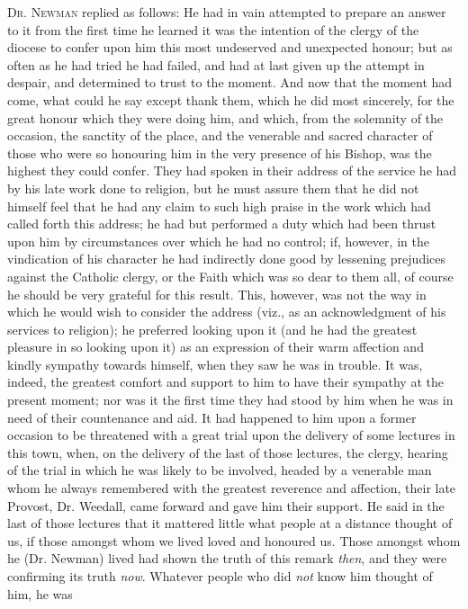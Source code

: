 D\textsc{r}. N\textsc{ewman}
replied as follows: He had in vain attempted to prepare an answer to
it from the first time he learned it was the intention of the clergy
of the diocese to confer upon him this most undeserved and unexpected
honour; but as often as he had tried he had failed, and had at last
given up the attempt in despair, and determined to trust to the
moment. And now that the moment had come, what could he say except
thank them, which he did most sincerely, for the great honour which
they were doing him, and which, from the solemnity of the occasion,
the sanctity of the place, and the venerable and sacred character of
those who were so honouring him in the very presence of his Bishop,
was the highest they could confer. They had spoken in their address of
the service he had by his late work done to religion, but he must
assure them that he did not himself feel that he had any claim to such
high praise in the work which had called forth this address; he had
but performed a duty which had been thrust upon him by circumstances
over which he had no control; if, however, in the vindication of his
character he had indirectly done good by lessening prejudices against
the Catholic clergy, or the Faith which was so dear to them all, of
course he should be very grateful for this result. This, however, was
not the way in which he would wish to consider the address (viz., as
an acknowledgment of his services to religion); he preferred looking
upon it (and he had the greatest pleasure in so looking upon it) as an
expression of their warm affection and kindly sympathy towards
himself, when they saw he was in trouble. It was, indeed, the greatest
comfort and support to him to have their sympathy at the present
moment; nor was it the first time they had stood by him when he was in
need of their countenance and aid. It had happened to him upon a
former occasion to be threatened with a great trial upon the delivery
of some lectures in this town, when, on the delivery of the last of
those lectures, the clergy, hearing of the trial in which he was
likely to be involved, headed by a venerable man whom he always
remembered with the greatest reverence and affection, their late
Provost, Dr. Weedall, came forward and gave him their support. He said
in the last of those lectures that it mattered little what people at a
distance thought of us, if those amongst whom we lived loved and
honoured us. Those amongst whom he (Dr. Newman) lived had shown the
truth of this remark \emph{then}, and they were confirming its truth \emph{now}.
Whatever people who did \emph{not} know him thought of him, he was
